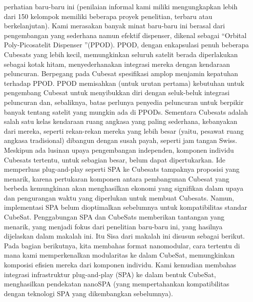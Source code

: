perhatian baru-baru ini (penilaian informal kami miliki
mengungkapkan lebih dari 150 kelompok memiliki beberapa proyek penelitian,
terbaru atau berkelanjutan). Kami merasakan banyak minat baru-baru ini
berasal dari pengembangan yang sederhana namun efektif
dispenser, dikenal sebagai “Orbital Poly-Picosatelit
Dispenser ”(PPOD). PPOD, dengan enkapsulasi penuh
beberapa Cubesats yang lebih kecil, memungkinkan seluruh satelit berada
diperlakukan sebagai kotak hitam, menyederhanakan integrasi mereka
dengan kendaraan peluncuran. Berpegang pada Cubesat
spesifikasi amplop menjamin kepatuhan terhadap
PPOD. PPOD memisahkan (untuk urutan pertama) kebutuhan
untuk pengembang Cubesat untuk menyibukkan diri dengan
seluk-beluk integrasi peluncuran dan, sebaliknya, batas
perlunya penyedia peluncuran untuk berpikir banyak tentang
satelit yang mungkin ada di PPODs.
Sementara Cubesats adalah salah satu kelas kendaraan ruang angkasa yang paling sederhana, kebanyakan dari mereka, seperti rekan-rekan mereka yang lebih besar (yaitu, pesawat ruang angkasa tradisional) dibangun dengan susah payah, seperti jam tangan Swiss. Meskipun ada lusinan upaya pengembangan independen, komponen individu Cubesats tertentu, untuk sebagian besar, belum dapat dipertukarkan. Ide memperluas plug-and-play seperti SPA ke Cubesats tampaknya proposisi yang menarik, karena pertukaran komponen antara pembangunan Cubesat yang berbeda kemungkinan akan menghasilkan ekonomi yang signifikan dalam upaya dan pengurangan waktu yang diperlukan untuk membuat Cubesats. Namun, implementasi SPA belum dioptimalkan sebelumnya untuk kompatibilitas standar CubeSat. Penggabungan SPA dan CubeSats memberikan tantangan yang menarik, yang menjadi fokus dari penelitian baru-baru ini, yang hasilnya dijelaskan dalam makalah ini.
Itu Sisa dari makalah ini disusun sebagai berikut. Pada bagian berikutnya, kita membahas format nanomodular, cara tertentu di mana kami memperkenalkan modularitas ke dalam CubeSat, memungkinkan komposisi efisien mereka dari komponen individu. Kami kemudian membahas integrasi infrastruktur plug-and-play (SPA) ke dalam bentuk CubeSat, menghasilkan pendekatan nanoSPA (yang mempertahankan kompatibilitas dengan teknologi SPA yang dikembangkan sebelumnya). 


